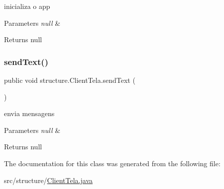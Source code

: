 inicializa o app 


\begin{DoxyParams}{Parameters}
{\em null} & \\
\hline
\end{DoxyParams}
\begin{DoxyReturn}{Returns}
null 
\end{DoxyReturn}
\mbox{\label{classstructure_1_1_client_tela_a7b102bb8543266eed71ff94ac46fd815}} 
\subsubsection{\texorpdfstring{send\+Text()}{sendText()}}
{\footnotesize\ttfamily public void structure.\+Client\+Tela.\+send\+Text (\begin{DoxyParamCaption}{ }\end{DoxyParamCaption})}



envia mensagens 


\begin{DoxyParams}{Parameters}
{\em null} & \\
\hline
\end{DoxyParams}
\begin{DoxyReturn}{Returns}
null 
\end{DoxyReturn}


The documentation for this class was generated from the following file\+:\begin{DoxyCompactItemize}
\item 
src/structure/\hyperlink{_client_tela_8java}{Client\+Tela.\+java}\end{DoxyCompactItemize}

